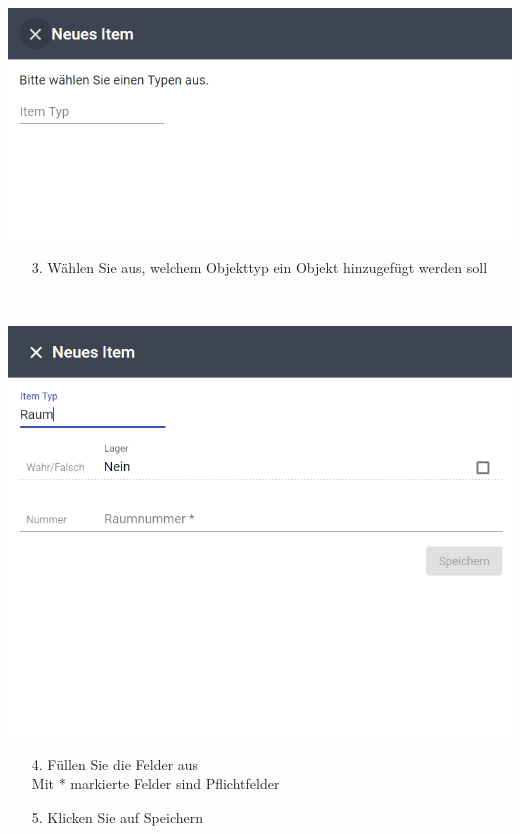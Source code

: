 \documentclass[11pt,a4paper]{report}
\begin{document}
	\begin{minipage}{0.5\linewidth}
	\includegraphics[width=\linewidth]{Inventar.png}
	\end{minipage}
	\hfill
	\begin{minipage}{0.4\linewidth}
	\begin{itemize}
		\item[3.] Wählen Sie aus, welchem Objekttyp ein Objekt hinzugefügt werden soll
	\end{itemize}
	\end{minipage}\\

	\begin{minipage}{0.5\linewidth}
	\includegraphics[width=\linewidth]{Inventar2.png}
\end{minipage}
\hfill
\begin{minipage}{0.4\linewidth}
	\begin{itemize}
		\item[4.] Füllen Sie die Felder aus\\
		Mit * markierte Felder sind Pflichtfelder
		\item[5.] Klicken Sie auf Speichern
	\end{itemize}
\end{minipage}\\
\end{document}
